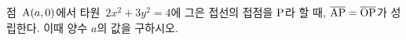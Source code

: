 점~$\mathrm{A}(a{,}\mkern3mu\mathopen{}0)$에서 타원~$2x^2+3y^2=4$에 그은 접선의 접점을 $\mathrm{P}$라 할 때, $\overline{\mathrm{AP}}=\overline{\mathrm{OP}}$가 성립한다. 이때 양수 $a$의 값을 구하시오. 
